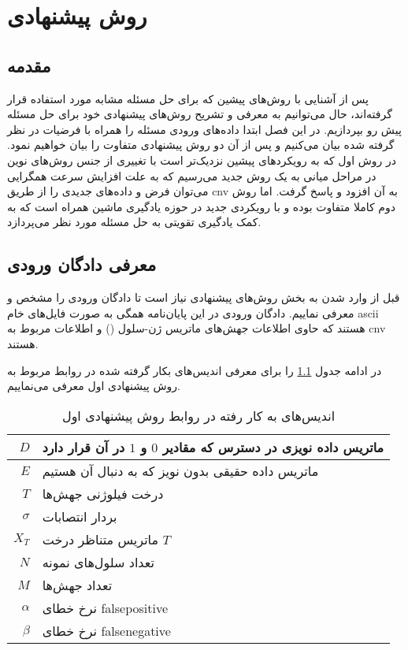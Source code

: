 
\chapter{روش پیشنهادی}
\section{مقدمه} 
پس از آشنایی با روش‌های پیشین که برای حل مسئله مشابه مورد استفاده قرار گرفته‌اند، حال می‌توانیم به معرفی و تشریح روش‌های پیشنهادی خود برای حل مسئله پیش رو بپردازیم. در این فصل ابتدا داده‌های ورودی مسئله را همراه با فرضیات در نظر گرفته شده بیان می‌کنیم و پس از آن دو روش پیشنهادی متفاوت را بیان خواهیم نمود. در روش اول که به رویکردهای پیشین نزدیک‌تر است با تغییری از جنس روش‌‌های نوین در مراحل میانی به یک روش جدید می‌رسیم که به علت افزایش سرعت همگرایی می‌توان فرض و داده‌های جدیدی را از طریق \gls{cnv} به آن افزود و پاسخ گرفت. اما روش دوم کاملا متفاوت بوده و با رویکردی جدید در حوزه یادگیری ماشین همراه است که به کمک یادگیری تقویتی به حل مسئله مورد نظر می‌پردازد.


\section{معرفی دادگان ورودی}
قبل از وارد شدن به بخش روش‌های پیشنهادی نیاز است تا دادگان ورودی را مشخص و معرفی نماییم. دادگان ورودی در این پایان‌نامه همگی به صورت فایل‌های خام \gls{ascii} هستند که حاوی اطلاعات جهش‌های ماتریس ژن-سلول () و اطلاعات مربوط به \gls{cnv} هستند.

در ادامه جدول
\ref{tab:firstpmIndices}
را برای معرفی اندیس‌های بکار گرفته شده در روابط مربوط به روش پیشنهادی اول معرفی می‌نماییم.

	\begin{table}[ht]
	\caption{اندیس‌های به کار رفته در روابط روش پیشنهادی اول}
	\label{tab:firstpmIndices}
	\centering
	\onehalfspacing
	\begin{tabularx}{0.9\textwidth}{|r|X|}
		\hline
		$D$	& ماتریس داده نویزی در دسترس که مقادیر $0$ و $1$ در آن قرار دارد \\
		\hline
		$E$	& ماتریس داده حقیقی بدون نویز که به دنبال آن هستیم \\
		\hline
		$T$	& درخت فیلوژنی جهش‌ها \\
		\hline
		$\sigma$	& بردار انتصابات \\
		\hline
		$X_T$	& ماتریس متناظر درخت $T$ \\
		\hline
		$N$		& تعداد سلول‌های نمونه \\
		\hline
		$M$	& تعداد جهش‌ها \\
		\hline
		$\alpha$	&  نرخ خطای \gls{falsepositive} \\
		\hline
		$\beta$	& نرخ خطای \gls{falsenegative} \\
		\hline
	\end{tabularx}
\end{table}



